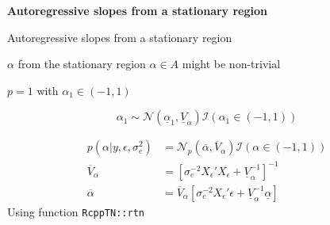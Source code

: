 \documentclass[notes,blackandwhite,mathsans,usenames,dvipsnames]{beamer}
\begin{document}
{
\begin{frame}

\begin{adjustwidth}{-0.5cm}{0cm}
\vspace{8.3cm}
\Large\textbf{{\color{mcxs2}Autoregressive slopes} {\color{mcxs1}from a stationary region}}
\end{adjustwidth}

\end{frame}
}



\begin{frame}{Autoregressive slopes from a stationary region}

 $\alpha$ {\color{mcxs2}from the stationary region} $\alpha\in A$ {\color{mcxs2}might be non-trivial}

 $p=1$ {\color{mcxs2}with} $\alpha_1\in(-1,1)$

$$
\alpha_1 \sim\mathcal{N}\left( \underline{\alpha}_1 ,\underline{V}_{\alpha}\right)\mathcal{I}(\alpha_1\in (-1,1))
$$

\begin{align*}
p\left( \alpha|y,\epsilon,\sigma^2_e \right) &= \mathcal{N}_p\left(\overline{\alpha},\overline{V}_\alpha\right)\mathcal{I}(\alpha\in (-1,1))\\
\overline{V}_\alpha &= \left[\sigma^{-2} _e X_\epsilon' X_\epsilon + \underline{V}_\alpha^{-1} \right]^{-1}\\
\overline{\alpha} &= \overline{V}_\alpha \left[\sigma^{-2} _e X_\epsilon' \epsilon + \underline{V}_\alpha^{-1}\underline{\alpha}  \right]
\end{align*}
{\color{mcxs2}Using function} \texttt{RcppTN::rtn}

\end{frame}
\end{document}
